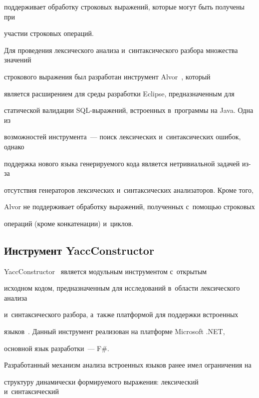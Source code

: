 поддерживает обработку строковых выражений, которые могут быть получены при 


участии строковых операций.





Для проведения лексического анализа и~синтаксического разбора множества значений 


строкового выражения был разработан инструмент Alvor~\cite{Alvor}, который 


является расширением для среды разработки Eclipse, предназначенным для 


статической валидации SQL-вы\-ра\-же\-ний, встроенных в~программы на Java. Одна из  


возможностей инструмента~--- поиск лексических и~синтаксических ошибок, однако 


поддержка нового языка генерируемого кода является нетривиальной задачей из-за 


отсутствия генераторов лексических и~синтаксических анализаторов. Кроме того, 


Alvor не поддерживает обработку выражений, полученных с~помощью строковых 


операций (кроме конкатенации) и~циклов.





\subsection{Инструмент YaccConstructor}





YaccConstructor~\cite{YC_article} является модульным инструментом с~открытым 


исходном кодом, предназначенным для исследований в~области лексического анализа 


и~синтаксического разбора, а~также платформой для поддержки встроенных 


языков~\cite{YC_SECR}. Данный инструмент реализован на платформе Microsoft .NET, 


основной язык разработки~--- F\#.





Разработанный механизм анализа встроенных языков ранее имел ограничения на 


структуру динамически формируемого выражения: лексический и~синтаксический 


